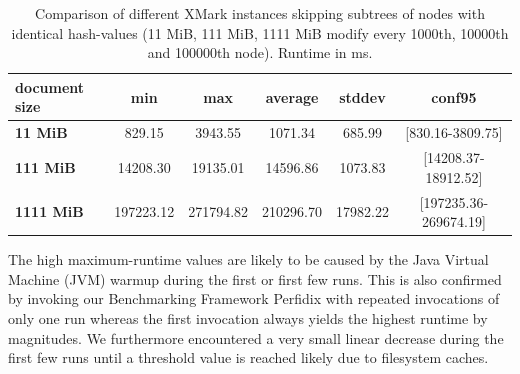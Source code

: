 \begin{table}[tb]
\centering 
\begin{tabular}[r]{|l|c|c|c|c|c|} 
\hline
\textbf{document size} & \textbf{min} & \textbf{max} & \textbf{average} & \textbf{stddev} & \textbf{conf95}\\
\hline
\hline
\textbf{11 MiB} & 829.15 & 3943.55 & 1071.34 & 685.99 & [830.16-3809.75] \\
\hline
\textbf{111 MiB} & 14208.30 & 19135.01 & 14596.86 & 1073.83 & [14208.37-18912.52]\\
\hline
\textbf{1111 MiB} & 197223.12  & 271794.82 & 210296.70 & 17982.22 & [197235.36-269674.19]\\
\hline
\end{tabular}
\label{chap3:compPrunedDiffInstances}
\vspace{0.5em} 
\caption{Comparison of different XMark instances skipping subtrees of nodes with identical hash-values (11 MiB, 111 MiB, 1111 MiB modify every 1000th, 10000th and 100000th node). Runtime in ms.}
\end{table}


The high maximum-runtime values are likely to be caused by the Java Virtual Machine (JVM) warmup during the first or first few runs. This is also confirmed by invoking our Benchmarking Framework Perfidix with repeated invocations of only one run whereas the first invocation always yields the highest runtime by magnitudes. We furthermore encountered a very small linear decrease during the first few runs until a threshold value is reached likely due to filesystem caches.

